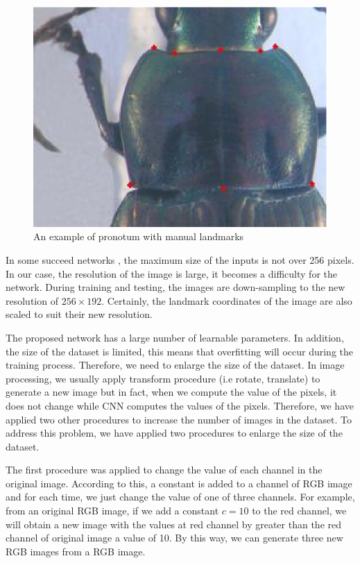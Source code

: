 \documentclass[conference]{IEEEtran}
\begin{document}
\begin{figure}[htbp]
	\centerline{\includegraphics[scale=0.8]{images/pronotum.eps}}
	\caption{An example of pronotum with manual landmarks}
	\label{figpronotum}
\end{figure}

In some succeed networks \cite{krizhevsky2012imagenet}\cite{sun2013deep}\cite{cintas2016automatic}, the maximum size of the inputs is not over 256 pixels. In our case, the resolution of the image is large, it becomes a difficulty for the network. During training and testing, the images are down-sampling to the new resolution of $256 \times 192$. Certainly, the landmark coordinates of the image are also scaled to suit their new resolution. 

The proposed network has a large number of learnable parameters. In addition, the size of the dataset is limited, this means that overfitting will occur during the training process. Therefore, we need to enlarge the size of the dataset. In image processing, we usually apply transform procedure (i.e rotate, translate) to generate a new image but in fact, when we compute the value of the pixels, it does not change while CNN computes the values of the pixels. Therefore, we have applied two other procedures to increase the number of images in the dataset. To address this problem, we have applied two procedures to enlarge the size of the dataset.

The first procedure was applied to change the value of each channel in the original image. According to this, a constant is added to a channel of RGB image and for each time, we just change the value of one of three channels. For example, from an original RGB image, if we add a constant $c = 10$ to the red channel, we will obtain a new image with the values at red channel by greater than the red channel of original image a value of 10. By this way, we can generate three new RGB images from a RGB image.
\end{document}
